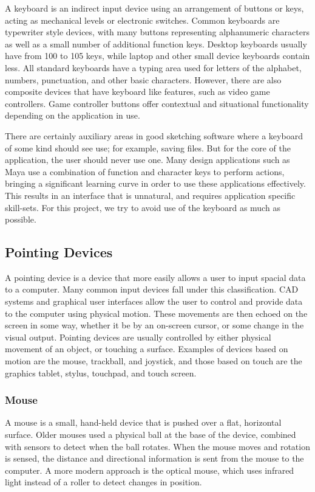 \documentclass[11pt]{report}
\begin{document}
A keyboard is an indirect input device using an arrangement of buttons or keys, acting as mechanical levels or electronic switches. 
Common keyboards are typewriter style devices, with many buttons representing alphanumeric characters as well as a small number of additional function keys.
Desktop keyboards usually have from 100 to 105 keys, while laptop and other small device keyboards contain less.
All standard keyboards have a typing area used for letters of the alphabet, numbers, punctuation, and other basic characters.
However, there are also composite devices that have keyboard like features, such as video game controllers. 
Game controller buttons offer contextual and situational functionality depending on the application in use.


There are certainly auxiliary areas in good sketching software where a keyboard of some kind should see use; for example, saving files. 
But for the core of the application, the user should never use one. 
Many design applications such as Maya use a combination of function and character keys to perform actions, bringing a significant learning curve in order to use these applications effectively.
This results in an interface that is unnatural, and requires application specific skill-sets.
For this project, we try to avoid use of the keyboard as much as possible.


\subsection{Pointing Devices}
 A pointing device is a device that more easily allows a user to input spacial data to a computer. 
 Many common input devices fall under this classification. 
 CAD systems and graphical user interfaces allow the user to control and provide data to the computer using physical motion.
 These movements are then echoed on the screen in some way, whether it be by an on-screen cursor, or some change in the visual output.
 Pointing devices are usually controlled by either physical movement of an object, or touching a surface.
 Examples of devices based on motion are the mouse, trackball, and joystick, and those based on touch are the graphics tablet, stylus, touchpad, and touch screen.
 
 \subsubsection{Mouse}
 A mouse is a small, hand-held device that is pushed over a flat, horizontal surface.
 Older mouses used a physical ball at the base of the device, combined with sensors to detect when the ball rotates.
 When the mouse moves and rotation is sensed, the distance and directional information is sent from the mouse to the computer.
 A more modern approach is the optical mouse, which uses infrared light instead of a roller to detect changes in position.
 
\end{document}
